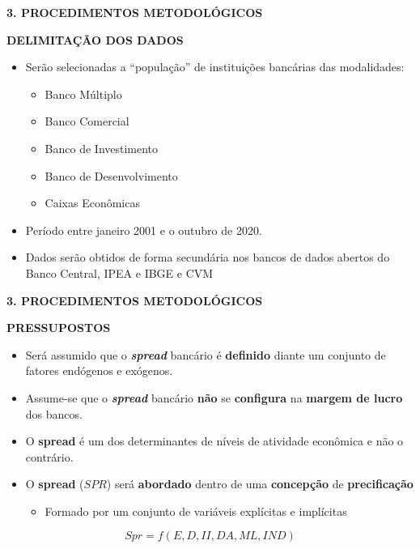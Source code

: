 \documentclass[ignorenonframetext,aspectratio=169,ignorenonframetext]{beamer}
\providecommand{\tightlist}{%
  \setlength{\itemsep}{0pt}\setlength{\parskip}{0pt}}
\begin{document}
\begin{frame}{\textbf{3. PROCEDIMENTOS METODOLÓGICOS}}
\protect\hypertarget{procedimentos-metodoluxf3gicos-1}{}

\textbf{DELIMITAÇÃO DOS DADOS}

\begin{itemize}
\item
  Serão selecionadas a ``população'' de instituições bancárias das
  modalidades:

  \begin{itemize}
  \tightlist
  \item
    Banco Múltiplo
  \item
    Banco Comercial
  \item
    Banco de Investimento
  \item
    Banco de Desenvolvimento
  \item
    Caixas Econômicas
  \end{itemize}
\item
  Período entre janeiro 2001 e o outubro de 2020.
\item
  Dados serão obtidos de forma secundária nos bancos de dados abertos do
  Banco Central, IPEA e IBGE e CVM
\end{itemize}

\end{frame}

\begin{frame}{\textbf{3. PROCEDIMENTOS METODOLÓGICOS}}
\protect\hypertarget{procedimentos-metodoluxf3gicos-2}{}

\textbf{PRESSUPOSTOS}

\begin{itemize}
\item
  Será assumido que o \textbf{\emph{spread}} bancário é
  \textbf{definido} diante um conjunto de fatores endógenos e exógenos.
\item
  Assume-se que o \textbf{\emph{spread}} bancário \textbf{não} se
  \textbf{configura} na \textbf{margem de lucro} dos bancos.
\item
  O \textbf{spread} é um dos determinantes de níveis de atividade
  econômica e não o contrário.
\item
  O \textbf{spread} (\(SPR\)) será \textbf{abordado} dentro de uma
  \textbf{concepção} de \textbf{precificação}

  \begin{itemize}
  \tightlist
  \item
    Formado por um conjunto de variáveis explícitas e implícitas
  \end{itemize}
\end{itemize}

\[
Spr = f(E,D,II,DA,ML,IND)
\]

\end{frame}
\end{document}
